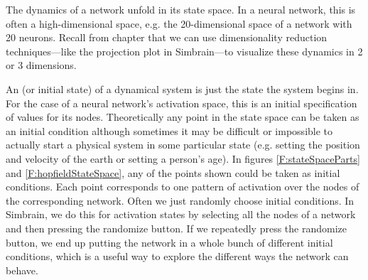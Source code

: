 The dynamics of a network unfold in its state space. In a neural network, this is often a high-dimensional space, e.g. the 20-dimensional space of a network with 20 neurons. Recall from chapter  that we can use dimensionality reduction techniques---like the projection plot in Simbrain---to visualize these dynamics in 2 or 3 dimensions.

 An  (or initial state) of a dynamical system is just the state the system begins in. For the case of a neural network's activation space, this is an initial
specification of values for its  nodes. Theoretically any point in the state
space can be taken as an initial condition although sometimes it may be
difficult or impossible to actually start a physical system in some particular state (e.g. setting the position and velocity of the earth or setting a person's age). In figures \ref{F:stateSpaceParts} and \ref{F:hopfieldStateSpace}, any of the points shown could be taken as initial conditions. Each point corresponds to one pattern of  activation over the nodes of the corresponding network. Often we just randomly choose initial conditions.
In Simbrain, we do this for activation states by selecting all the nodes of a network and then
pressing the randomize button. If we repeatedly press the randomize button, we end up
putting the network in a whole bunch of different initial conditions, which is a useful way to explore the different ways the network can behave.

